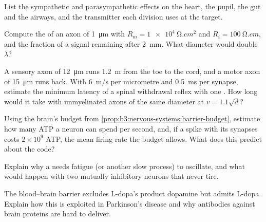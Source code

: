 \begin{exercise}[$\star$]\label{exo:b3:nervous-systems:4}
List the sympathetic and parasympathetic effects on the heart, the
pupil, the gut and the airways, and the transmitter each division uses
at the target.
\end{exercise}

\begin{exercise}[$\star\star$]\label{exo:b3:nervous-systems:5}
Compute the  of an axon of \qty{1}{\micro m} with $R_{m}
= \qty{1e4}{\ohm.cm^2}$ and $R_{i} = \qty{100}{\ohm.cm}$, and the
fraction of a signal remaining after \qty{2}{mm}. What diameter would
double $\lambda$?
\end{exercise}

\begin{exercise}[$\star\star$]\label{exo:b3:nervous-systems:6}
A sensory axon of \qty{12}{\micro m} runs \qty{1.2}{m} from the toe to
the cord, and a motor axon of \qty{15}{\micro m} runs back. With
\qty{6}{m/s} per micrometre and \qty{0.5}{ms} per synapse, estimate the
minimum latency of a spinal withdrawal reflex with one .
How long would it take with unmyelinated axons of the same diameter at
$v = 1.1\sqrt{d}$?
\end{exercise}

\begin{exercise}[$\star\star$]\label{exo:b3:nervous-systems:7}
Using the brain's budget from
\cref{prop:b3:nervous-systems:barrier-budget}, estimate how many ATP a
neuron can spend per second, and, if a spike with its synapses costs
$2\times 10^{9}$ ATP, the mean firing rate the budget allows. What does
this predict about the code?
\end{exercise}

\begin{exercise}[$\star\star$]\label{exo:b3:nervous-systems:8}
Explain why a  needs fatigue (or another slow
process) to oscillate, and what would happen with two mutually
inhibitory neurons that never tire.
\end{exercise}

\begin{exercise}[$\star\star$]\label{exo:b3:nervous-systems:9}
The blood--brain barrier excludes L-dopa's product dopamine but admits
L-dopa. Explain how this is exploited in Parkinson's disease and why
antibodies against brain proteins are hard to deliver.
\end{exercise}


